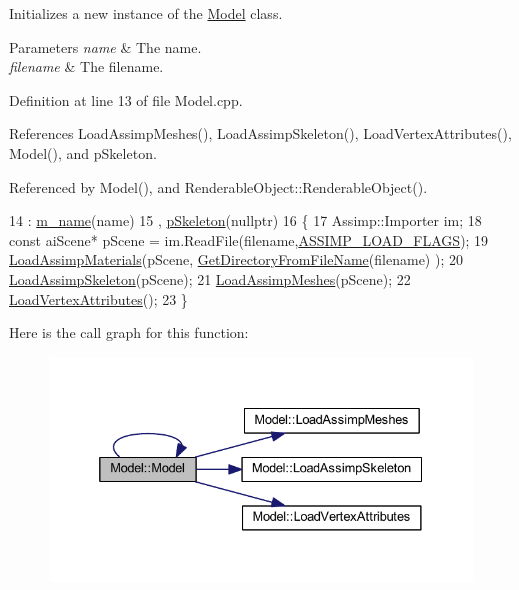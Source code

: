 Initializes a new instance of the \hyperlink{class_model}{Model} class. 


\begin{DoxyParams}{Parameters}
{\em name} & The name.\\
\hline
{\em filename} & The filename.\\
\hline
\end{DoxyParams}


Definition at line 13 of file Model.\+cpp.



References Load\+Assimp\+Meshes(), Load\+Assimp\+Skeleton(), Load\+Vertex\+Attributes(), Model(), and p\+Skeleton.



Referenced by Model(), and Renderable\+Object\+::\+Renderable\+Object().


\begin{DoxyCode}
14   : \hyperlink{class_model_a862ab593f7a9e07ed55fd734b7ea6abd}{m\_name}(name)
15   , \hyperlink{class_model_a2318827a9c98ccd63bfbbb0f3ac84b8a}{pSkeleton}(\textcolor{keyword}{nullptr})
16 \{
17   Assimp::Importer im;
18   \textcolor{keyword}{const} aiScene* pScene = im.ReadFile(filename,\hyperlink{_model_8cpp_a08021ce46ea33d5ccbf817b459424b03}{ASSIMP\_LOAD\_FLAGS});
19   \hyperlink{class_model_aad522a066f0ff83386224f9e4b9f839a}{LoadAssimpMaterials}(pScene, \hyperlink{_utility_8h_a9c31d382f710412f5f7892968c842d36}{GetDirectoryFromFileName}(filename)
      );
20   \hyperlink{class_model_a694937ff39bfa5fc570a17911ebad663}{LoadAssimpSkeleton}(pScene);
21   \hyperlink{class_model_a473f1ba420d4c80c7691924a00f41550}{LoadAssimpMeshes}(pScene);
22   \hyperlink{class_model_a16116c10d24e886acf1dcb44718695ea}{LoadVertexAttributes}();
23 \}
\end{DoxyCode}


Here is the call graph for this function\+:\nopagebreak
\begin{figure}[H]
\begin{center}
\leavevmode
\includegraphics[width=332pt]{class_model_ae74bb9abcef7456bb360317cd1dda70c_cgraph}
\end{center}
\end{figure}




